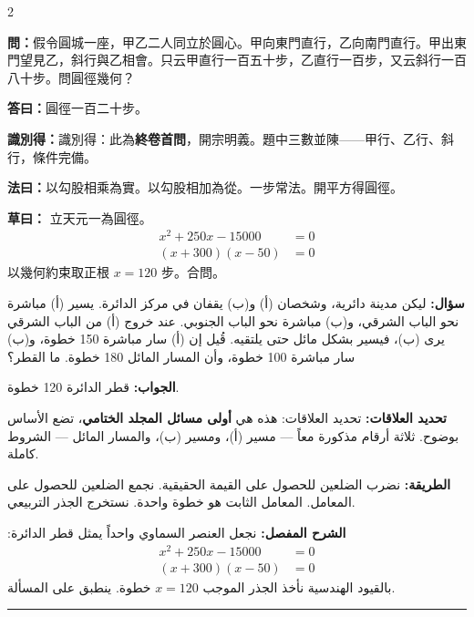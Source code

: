 \documentclass[11pt,a4paper]{article}
\newcommand{\ar}[1]{\arabicfont\beginR #1\endR}
\newcommand{\arb}[1]{\textbf{\arabicfont\beginR #1\endR}}
\newcommand{\longline}{\noindent\rule{\textwidth}{0.4pt}}
\newcommand{\arnote}[1]{\textcolor{arabicblue}{\ar{#1}}}
\newcommand{\wen}[1]{\par\noindent\textbf{\textcolor{probcolor}{問：}}{#1}\par}
\newcommand{\da}[1]{\par\noindent\textbf{\textcolor{anscolor}{答曰：}}{#1}\par}
\newcommand{\fayue}[1]{\par\noindent\textbf{\textcolor{methodcolor}{法曰：}}{#1}\par}
\newcommand{\caoyue}[1]{\par\noindent\textbf{草曰：}{#1}\par}
\newcommand{\zhi}[1]{\par\noindent\textbf{識別得：}{#1}\par}
\newcommand{\arwen}[1]{\par\noindent\arb{سؤال: }\arnote{#1}\par}
\newcommand{\arjwb}[1]{\par\noindent\arb{الجواب: }\arnote{#1}\par}
\newcommand{\arqwd}[1]{\par\noindent\arb{الطريقة: }\arnote{#1}\par}
\newcommand{\arshr}[1]{\par\noindent\arb{الشرح المفصل: }\arnote{#1}\par}
\newcommand{\arfl}[1]{\par\noindent\arb{تحديد العلاقات: }\arnote{#1}\par}
\begin{document}
\begin{paracol}{2}

\begin{leftcolumn}
\wen{假令圓城一座，甲乙二人同立於圓心。甲向東門直行，乙向南門直行。甲出東門望見乙，斜行與乙相會。只云甲直行一百五十步，乙直行一百步，又云斜行一百八十步。問圓徑幾何？}

\da{圓徑一百二十步。}

\zhi{識別得：此為\textbf{終卷首問}，開宗明義。題中三數並陳——甲行、乙行、斜行，條件完備。}

\fayue{以勾股相乘為實。以勾股相加為從。一步常法。開平方得圓徑。}

\caoyue{
立天元一為圓徑。
\begin{align*}
x^2 + 250x - 15000 &= 0 \\
(x + 300)(x - 50) &= 0
\end{align*}
以幾何約束取正根 $x = 120$ 步。合問。}
\end{leftcolumn}

\begin{rightcolumn}
\arwen{ليكن مدينة دائرية، وشخصان (أ) و(ب) يقفان في مركز الدائرة. يسير (أ) مباشرة نحو الباب الشرقي، و(ب) مباشرة نحو الباب الجنوبي. عند خروج (أ) من الباب الشرقي يرى (ب)، فيسير بشكل مائل حتى يلتقيه. قُيل إن (أ) سار مباشرة 150 خطوة، و(ب) سار مباشرة 100 خطوة، وأن المسار المائل 180 خطوة. ما القطر؟}

\arjwb{قطر الدائرة 120 خطوة.}

\arfl{تحديد العلاقات: هذه هي \textbf{أولى مسائل المجلد الختامي}، تضع الأساس بوضوح. ثلاثة أرقام مذكورة معاً — مسير (أ)، ومسير (ب)، والمسار المائل — الشروط كاملة.}

\arqwd{نضرب الضلعين للحصول على القيمة الحقيقية. نجمع الضلعين للحصول على المعامل. المعامل الثابت هو خطوة واحدة. نستخرج الجذر التربيعي.}

\arshr{نجعل العنصر السماوي واحداً يمثل قطر الدائرة:
\begin{align*}
x^2 + 250x - 15000 &= 0 \\
(x + 300)(x - 50) &= 0
\end{align*}
بالقيود الهندسية نأخذ الجذر الموجب $x = 120$ خطوة. ينطبق على المسألة.}
\end{rightcolumn}

\end{paracol}

\vspace{0.3cm}
\longline

\end{document}

